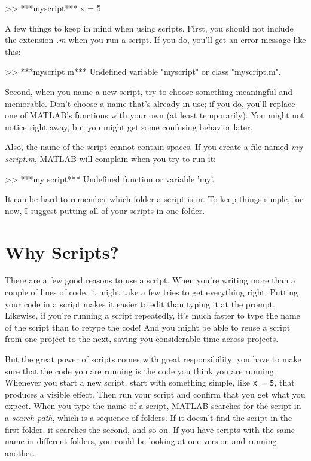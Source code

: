 \begin{code}
>> ***myscript***
x = 5
\end{code}

A few things to keep in mind when using scripts. First, you should not include the extension {\em .m} when you run a script.  If you do, you'll get an error message like this:

\begin{code}
>> ***myscript.m***
Undefined variable "myscript" or class "myscript.m".
\end{code}

Second, when you name a new script, try to choose something meaningful and memorable.
Don't choose a name that's already in use; if you do, you'll replace one of MATLAB's functions with your own (at least temporarily). 
You might not notice right away, but you might get some confusing behavior later.


Also, the name of the script cannot contain spaces.  If you create
a file named {\em my script.m}, MATLAB will complain when you try
to run it:

\begin{code}
>> ***my script***
Undefined function or variable 'my'.
\end{code}

It can be hard to remember which folder a script is in.  To keep things simple,
for now, I suggest putting all of your scripts in one folder.

\section{Why Scripts?}

There are a few good reasons to use a script. When you're writing more than a couple of lines of code, it might take a few tries to get everything right.  Putting your code
in a script makes it easier to edit than typing it at the prompt. Likewise, if you're running a script repeatedly, it's much faster to type the name of the script than to retype the code! And you might be able to reuse a script from one project to the next, saving you considerable time across projects.



But the great power of scripts comes with great responsibility: you have to make sure that the code you are running is the code you think you are running.
Whenever you start a new script, start with something simple, like \lstinline{x = 5}, that produces a visible effect. Then run your script and confirm that you get what you expect.
When you type the name of a script, MATLAB searches for the script in a {\em search path}, which is a sequence of folders.  If it doesn't find the script in the first folder, it searches the second, and so on.
If you have scripts with the same name in different folders, you could be looking at one version and running another.

